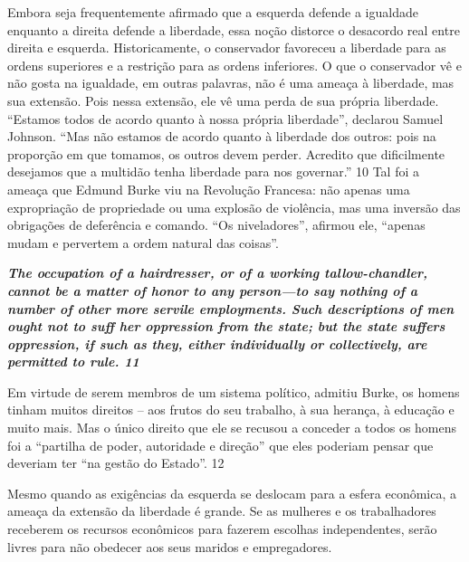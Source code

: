 \par
 
Embora seja frequentemente afirmado que a esquerda defende a igualdade enquanto a direita defende a liberdade, essa noção distorce o desacordo real entre direita e esquerda. Historicamente, o conservador favoreceu a liberdade para as ordens superiores e a restrição para as ordens inferiores. O que o conservador vê e não gosta na igualdade, em outras palavras, não é uma ameaça à liberdade, mas sua extensão. Pois nessa extensão, ele vê uma perda de sua própria liberdade. “Estamos todos de acordo quanto à nossa própria liberdade”, declarou Samuel Johnson. “Mas não estamos de acordo quanto à liberdade dos outros: pois na proporção em que tomamos, os outros devem perder. Acredito que dificilmente desejamos que a multidão tenha liberdade para nos governar.”
 {\color{blue} 10}  
Tal foi a ameaça que Edmund Burke viu na Revolução Francesa: não apenas uma expropriação de propriedade ou uma explosão de violência, mas uma inversão das obrigações de deferência e comando. “Os niveladores”, afirmou ele, “apenas mudam e pervertem a ordem natural das coisas”.
 
\par
 

 \textbf{\textit{The occupation of a hairdresser, or of a working tallow-chandler, cannot be a matter of honor to any person—to say nothing of a number of other more servile employments. Such descriptions of men ought not to suff her oppression from the state; but the state suffers oppression, if such as they, either individually or collectively, are permitted to rule. {{\color{blue} 11} } } }  
 
 
\par
 
Em virtude de serem membros de um sistema político, admitiu Burke, os homens tinham muitos direitos – aos frutos do seu trabalho, à sua herança, à educação e muito mais. Mas o único direito que ele se recusou a conceder a todos os homens foi a “partilha de poder, autoridade e direção” que eles poderiam pensar que deveriam ter “na gestão do Estado”.
 {\color{blue} 12}  

 
\par
 
Mesmo quando as exigências da esquerda se deslocam para a esfera econômica, a ameaça da extensão da liberdade é grande. Se as mulheres e os trabalhadores receberem os recursos econômicos para fazerem escolhas independentes, serão livres para não obedecer aos seus maridos e empregadores.
 
